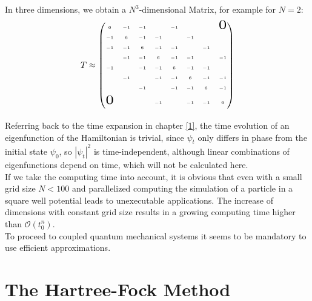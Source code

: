 \documentclass[twoside,        %
			   11pt,			%
               BCOR10mm,       %
               ngerman,english  %
               ]{scrartcl}
\begin{document}
In three dimensions, we obtain a $N^3$-dimensional Matrix, for example for $N=2$:
\begin{align*}
T \approx
\tiny
\begin{pmatrix}
 6 & -1 & -1 &  & -1 &  &  & \scalebox{3}{$0$}  \\\\
   -1 & 6 & -1 & -1 &  & -1 &  & \\\\
     -1 & -1 & 6 & -1 & -1 &  & -1 & \\\\
        & -1 & -1 & 6 & -1 & -1 &  & -1\\\\
        -1 &  & -1 & -1 & 6 & -1 & -1 & \\\\
           & -1 &  & -1 & -1 & 6 & -1 & -1\\\\
             &  & -1 &  & -1 & -1 & 6 & -1\\\\
              \scalebox{3}{$0$}  &  &  & -1 &  & -1 & -1 & 6\\\\
              \end{pmatrix}
\end{align*}

Referring back to the time expansion in chapter \ref{1}, the time evolution of an eigenfunction of the Hamiltonian is trivial, since $\psi_t$ only differs in phase from the initial state $\psi_0$, so ${|\psi_t|}^2$ is time-independent, although linear combinations of eigenfunctions depend on time, which will not be calculated here.\\

If we take the computing time into account, it is obvious that even with a small grid size $N<100$ and parallelized computing the simulation of a particle in a square well potential leads to unexecutable applications. The increase of dimensions with constant grid size results in a growing computing time higher than $\mathcal O (t_0^n)$. \\

To proceed to coupled quantum mechanical systems it seems to be mandatory to use efficient approximations.

\newpage


\section{The Hartree-Fock Method}\label{CH:HF}
    
\end{document}
